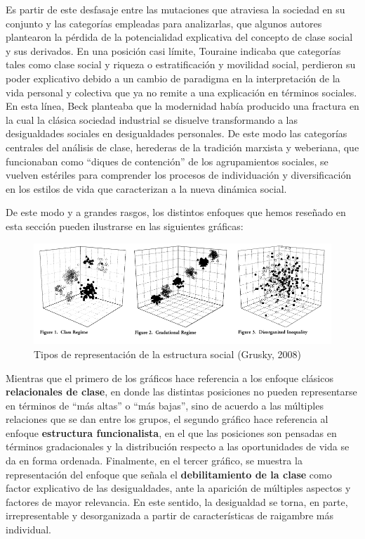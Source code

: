 \documentclass[
]{book}
\begin{document}
Es partir de este desfasaje entre las mutaciones que atraviesa la sociedad en su conjunto y las categorías empleadas para analizarlas, que algunos autores plantearon la pérdida de la potencialidad explicativa del concepto de clase social y sus derivados. En una posición casi límite, Touraine \citeyearpar{Touraine2005} indicaba que categorías tales como clase social y riqueza o estratificación y movilidad social, perdieron su poder explicativo debido a un cambio de paradigma en la interpretación de la vida personal y colectiva que ya no remite a una explicación en términos sociales. En esta línea, Beck \citeyearpar{Beck1998} planteaba que la modernidad había producido una fractura en la cual la clásica sociedad industrial se disuelve transformando a las desigualdades sociales en desigualdades personales. De este modo las categorías centrales del análisis de clase, herederas de la tradición marxista y weberiana, que funcionaban como ``diques de contención'' de los agrupamientos sociales, se vuelven estériles para comprender los procesos de individuación y diversificación en los estilos de vida que caracterizan a la nueva dinámica social.

De este modo y a grandes rasgos, los distintos enfoques que hemos reseñado en esta sección pueden ilustrarse en las siguientes gráficas:

\begin{figure}

{\centering \includegraphics[width=0.8\linewidth]{imagenes/grusky2} 

}

\caption{Tipos de representación de la estructura social (Grusky, 2008)}\label{fig:unnamed-chunk-85}
\end{figure}

Mientras que el primero de los gráficos hace referencia a los enfoque clásicos \textbf{relacionales de clase}, en donde las distintas posiciones no pueden representarse en términos de ``más altas'' o ``más bajas'', sino de acuerdo a las múltiples relaciones que se dan entre los grupos, el segundo gráfico hace referencia al enfoque \textbf{estructura funcionalista}, en el que las posiciones son pensadas en términos gradacionales y la distribución respecto a las oportunidades de vida se da en forma ordenada. Finalmente, en el tercer gráfico, se muestra la representación del enfoque que señala el \textbf{debilitamiento de la clase} como factor explicativo de las desigualdades, ante la aparición de múltiples aspectos y factores de mayor relevancia. En este sentido, la desigualdad se torna, en parte, irrepresentable y desorganizada a partir de características de raigambre más individual.
\end{document}
